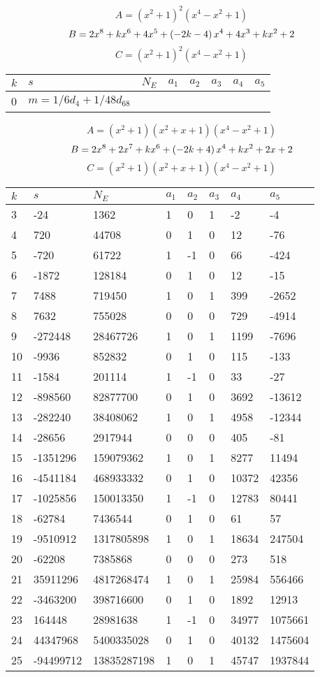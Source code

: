 \documentclass{amsart}
\begin{document}
$$A=(x^2
 + 1)^{2}(x^4
 - x^2
 + 1)$$
$$B=2\*x^8
 + k\*x^6
 + 4\*x^5
 + \left(-2\*k
 - 4\right) \*x^4
 + 4\*x^3
 + k\*x^2
 + 2$$
$$C=(x^2
 + 1)^{2}(x^4
 - x^2
 + 1)$$
\begin{longtable}{|l|l|l|lllll|}
\hline
$k$ & $s$ & $N_E$ & $a_1$ & $a_2$ & $a_3$ & $a_4$ & $a_5$\\
\hline
0&$m=1/6d_{4}+1/48d_{68}$&&\multicolumn{5}{c|}{}\\
\hline
\end{longtable}
$$A=(x^2
 + 1)(x^2
 + x
 + 1)(x^4
 - x^2
 + 1)$$
$$B=2\*x^8
 + 2\*x^7
 + k\*x^6
 + \left(-2\*k
 + 4\right) \*x^4
 + k\*x^2
 + 2\*x
 + 2$$
$$C=(x^2
 + 1)(x^2
 + x
 + 1)(x^4
 - x^2
 + 1)$$
\begin{longtable}{|l|l|l|lllll|}
\hline
$k$ & $s$ & $N_E$ & $a_1$ & $a_2$ & $a_3$ & $a_4$ & $a_5$\\
\hline
3&-24&1362&1&0&1&-2&-4\\
4&720&44708&0&1&0&12&-76\\
5&-720&61722&1&-1&0&66&-424\\
6&-1872&128184&0&1&0&12&-15\\
7&7488&719450&1&0&1&399&-2652\\
8&7632&755028&0&0&0&729&-4914\\
9&-272448&28467726&1&0&1&1199&-7696\\
10&-9936&852832&0&1&0&115&-133\\
11&-1584&201114&1&-1&0&33&-27\\
12&-898560&82877700&0&1&0&3692&-13612\\
13&-282240&38408062&1&0&1&4958&-12344\\
14&-28656&2917944&0&0&0&405&-81\\
15&-1351296&159079362&1&0&1&8277&11494\\
16&-4541184&468933332&0&1&0&10372&42356\\
17&-1025856&150013350&1&-1&0&12783&80441\\
18&-62784&7436544&0&1&0&61&57\\
19&-9510912&1317805898&1&0&1&18634&247504\\
20&-62208&7385868&0&0&0&273&518\\
21&35911296&4817268474&1&0&1&25984&556466\\
22&-3463200&398716600&0&1&0&1892&12913\\
23&164448&28981638&1&-1&0&34977&1075661\\
24&44347968&5400335028&0&1&0&40132&1475604\\
25&-94499712&13835287198&1&0&1&45747&1937844\\

\end{longtable}
\end{document}
